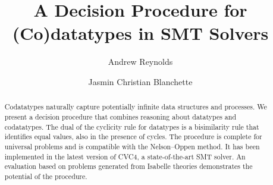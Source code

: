 \newcommand{\thO}{T_{o}}
\newcommand{\thD}{T_{d}}

\newcommand\Types{\mathcal{Y}}
\newcommand\Funcs{\mathcal{F}}

\newcommand\Data{\Types_{\mathrm{dt}}}
\newcommand\Codata{\Types_{\mathrm{codt}}}
\newcommand\Nondata{\Types_{\mathrm{ord}}}

\newcommand\Ctr{\Funcs_{\mathrm{ctr}}}
\newcommand\Sel{\Funcs_{\mathrm{sel}}}

\newcommand\vthinspace{\kern+0.083333em}
\newcommand\negvthinspace{\kern-0.083333em}

\usepackage[
   a4paper,
   pdftex,
   pdftitle={A Decision Procedure for (Co)datatypes in SMT Solvers},
   pdfauthor={Andrew Reynolds and Jasmin Christian Blanchette},
   pdfkeywords={},
   pdfborder={0 0 0},
   draft=false,
   bookmarksnumbered,
   bookmarks,
   bookmarksdepth=2,
   bookmarksopenlevel=2,
   bookmarksopen]{hyperref}


\global\def\figurename{Figure}


\makeatletter
\ps@myheadings
\makeatother







\title{A Decision Procedure for (Co)datatypes in SMT Solvers}

\author {Andrew Reynolds \and Jasmin Christian Blanchette}

\maketitle

\begin{abstract}
Codatatypes naturally capture potentially infinite data structures and
processes. We present a decision procedure that combines reasoning about
datatypes and codatatypes. The dual of the cyclicity rule for datatypes is a
bisimilarity rule that identifies equal values, also in the presence of cycles.
The procedure is complete for universal problems and is compatible with the
Nelson--Oppen method. It has been implemented in the latest version of CVC4, a
state-of-the-art SMT solver. An evaluation based on problems generated from
Isabelle theories demonstrates the potential of the procedure.
\end{abstract}

